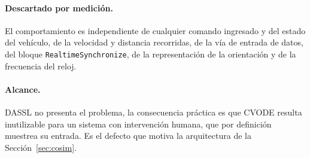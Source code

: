 


\paragraph{Descartado por medición.} El comportamiento es independiente de cualquier comando ingresado y del estado del vehículo, de la velocidad y distancia recorridas, de la vía de entrada de datos, del bloque \verb|RealtimeSynchronize|, de la representación de la orientación y de la frecuencia del reloj.



\paragraph{Alcance.} DASSL no presenta el problema, la consecuencia práctica es que CVODE resulta inutilizable para un sistema con intervención humana, que por definición muestrea su entrada. Es el defecto que motiva la arquitectura de la Sección~\ref{sec:cosim}.





